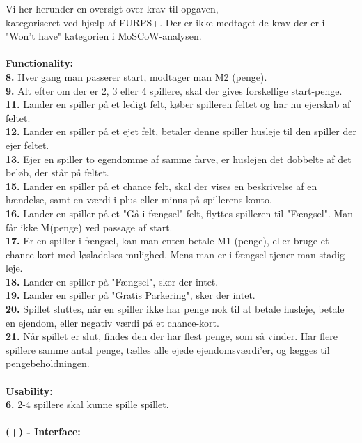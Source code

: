 \noindent Vi her herunder en oversigt over krav til opgaven, \\ kategoriseret ved hjælp af FURPS+. Der er ikke medtaget de krav der er i "Won't have" kategorien i MoSCoW-analysen.
\\\\\textbf{Functionality:}\\
    \textbf{8.} Hver gang man passerer start, modtager man M2 (penge). 
    \\
    \textbf{9.} Alt efter om der er 2, 3 eller 4 spillere, skal der gives forskellige start-penge. 
    \\
    \textbf{11.} Lander en spiller på et ledigt felt, køber spilleren feltet og har nu ejerskab af feltet. 
    \\
    \textbf{12.} Lander en spiller på et ejet felt, betaler denne spiller husleje til den spiller der ejer feltet. 
    \\
    \textbf{13.} Ejer en spiller to egendomme af samme farve, er huslejen det dobbelte af det beløb, der står på feltet. 
    \\
    \textbf{15.} Lander en spiller på et chance felt, skal der vises en beskrivelse af en hændelse, samt en værdi i plus eller minus på spillerens konto. 
    \\
    \textbf{16.}
    Lander en spiller på et "Gå i fængsel"-felt, flyttes spilleren til "Fængsel". Man får ikke M(penge) ved passage af start. 
    \\
    \textbf{17.}
    Er en spiller i fængsel, kan man enten betale M1 (penge), eller bruge et chance-kort med løsladelses-mulighed. Mens man er i fængsel tjener man stadig leje. 
    \\
    \textbf{18.} Lander en spiller på "Fængsel", sker der intet. 
    \\
    \textbf{19.} Lander en spiller på "Gratis Parkering", sker der intet. 
    \\
    \textbf{20.} Spillet sluttes, når en spiller ikke har penge nok til at betale husleje, betale en ejendom, eller negativ værdi på et chance-kort. \\
    \textbf{21.} Når spillet er slut, findes den der har flest penge, som så vinder. Har flere spillere samme antal penge, tælles alle ejede ejendomsværdi’er, og lægges til pengebeholdningen.
\\\\\textbf{Usability:}\\
    \textbf{6.} 2-4 spillere skal kunne spille spillet.
\\\\\textbf{(+) - Interface:}\\
